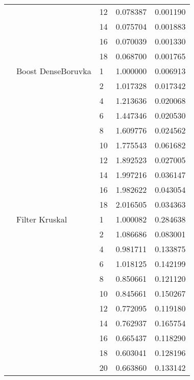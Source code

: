 \begin{tabular}{lllrr}
                      &            & 12 &  0.078387 &  0.001190 \\
                      &            & 14 &  0.075704 &  0.001883 \\
                      &            & 16 &  0.070039 &  0.001330 \\
                      &            & 18 &  0.068700 &  0.001765 \\
                      & Boost DenseBoruvka & 1  &  1.000000 &  0.006913 \\
                      &            & 2  &  1.017328 &  0.017342 \\
                      &            & 4  &  1.213636 &  0.020068 \\
                      &            & 6  &  1.447346 &  0.020530 \\
                      &            & 8  &  1.609776 &  0.024562 \\
                      &            & 10 &  1.775543 &  0.061682 \\
                      &            & 12 &  1.892523 &  0.027005 \\
                      &            & 14 &  1.997216 &  0.036147 \\
                      &            & 16 &  1.982622 &  0.043054 \\
                      &            & 18 &  2.016505 &  0.034363 \\
                      & Filter Kruskal & 1  &  1.000082 &  0.284638 \\
                      &            & 2  &  1.086686 &  0.083001 \\
                      &            & 4  &  0.981711 &  0.133875 \\
                      &            & 6  &  1.018125 &  0.142199 \\
                      &            & 8  &  0.850661 &  0.121120 \\
                      &            & 10 &  0.845661 &  0.150267 \\
                      &            & 12 &  0.772095 &  0.119180 \\
                      &            & 14 &  0.762937 &  0.165754 \\
                      &            & 16 &  0.665437 &  0.118290 \\
                      &            & 18 &  0.603041 &  0.128196 \\
                      &            & 20 &  0.663860 &  0.133142 \\

\end{tabular}
